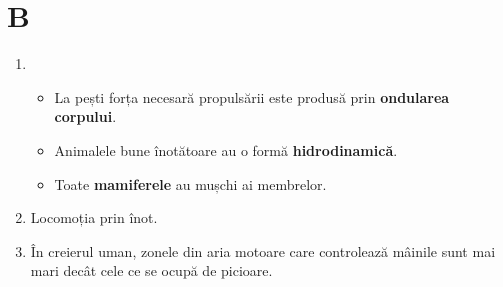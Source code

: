 \documentclass{article}
\begin{document}
\section*{B}
\begin{enumerate}
	\item \begin{itemize}
		\item La pești forța necesară propulsării este produsă prin \textbf{ondularea corpului}.
		\item Animalele bune înotătoare au o formă \textbf{hidrodinamică}.
		\item Toate \textbf{mamiferele} au mușchi ai membrelor.
	\end{itemize}
	\item Locomoția prin înot.
	\item În creierul uman, zonele din aria motoare care controlează mâinile sunt mai mari decât cele ce se ocupă de picioare.
\end{enumerate}
\end{document}
